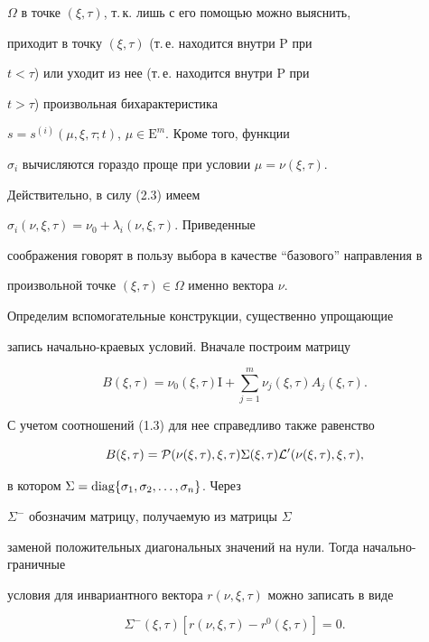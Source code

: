 $\Omega$ в точке $(\xi,\tau)$, т.\,к. лишь с его помощью можно выяснить,


приходит в точку $(\xi,\tau)$ (т.\,е. находится внутри $\mathrm P$ при 


$t < \tau$) или уходит из нее (т.\,е. находится внутри $\mathrm P$ при 


$t > \tau$) произвольная бихарактеристика 


$s=s^{(i)}(\mu,\xi,\tau;t)$, $\mu \in {\mathrm E}^m$. Кроме того, функции 


$\sigma_i$ вычисляются гораздо проще при условии $ \mu=\nu(\xi, \tau)$.


Действительно, в силу (2.3) имеем 


$\sigma_i (\nu,\xi,\tau)=\nu_0+{\lambda_i} (\nu,\xi,\tau)$. Приведенные


соображения говорят в пользу выбора в качестве ``базового'' направления в 


произвольной точке $(\xi,\tau) \in \Omega$ именно вектора $\nu$.





Определим вспомогательные конструкции, существенно упрощающие 


запись начально-кра\-е\-вых условий. Вначале построим матрицу


$$


B(\xi,\tau)=\nu_0(\xi,\tau){\mathrm I}+\sum_{j=1}^{m} \nu_j (\xi, \tau) 


A_{j}(\xi,\tau).


$$


С учетом соотношений (1.3) для нее справедливо также равенство 


$$


B(\xi,\tau)={\cal P} (\nu(\xi,\tau),\xi,\tau) \Sigma(\xi,\tau)


{\cal L}^{\prime} (\nu(\xi, \tau), \xi,\tau),


$$ 


в котором $\Sigma=\operatorname{diag} \{ \sigma_1,\sigma_2,\dotsc,\sigma_n \}$. Через


$\Sigma^{-}$ обозначим матрицу, получаемую из матрицы $\Sigma$


заменой положительных диагональных значений на нули. Тогда начально-граничные


условия для инвариантного вектора $r(\nu,\xi,\tau)$ можно записать в виде


\begin{equation}


\Sigma^{-} (\xi,\tau) [r(\nu,\xi,\tau) - r^0 (\xi,\tau)]=0.


\end{equation}


